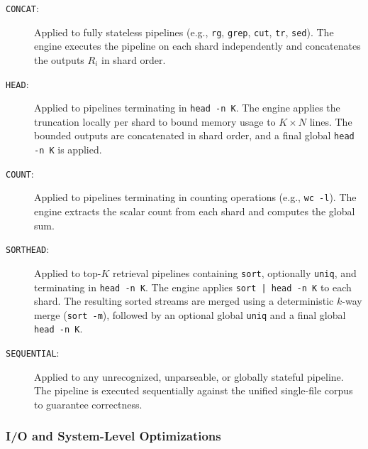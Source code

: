 \documentclass{article} %
\begin{document}
\begin{description}
    \item[\texttt{CONCAT}:] Applied to fully stateless pipelines (e.g., \texttt{rg}, \texttt{grep}, \texttt{cut}, \texttt{tr}, \texttt{sed}). The engine executes the pipeline on each shard independently and concatenates the outputs $R_i$ in shard order.
    
    \item[\texttt{HEAD}:] Applied to pipelines terminating in \texttt{head -n K}. The engine applies the truncation locally per shard to bound memory usage to $K \times N$ lines. The bounded outputs are concatenated in shard order, and a final global \texttt{head -n K} is applied.
    
    \item[\texttt{COUNT}:] Applied to pipelines terminating in counting operations (e.g., \texttt{wc -l}). The engine extracts the scalar count from each shard and computes the global sum.
    
    \item[\texttt{SORTHEAD}:] Applied to top-$K$ retrieval pipelines containing \texttt{sort}, optionally \texttt{uniq}, and terminating in \texttt{head -n K}. The engine applies \texttt{sort | head -n K} to each shard. The resulting sorted streams are merged using a deterministic $k$-way merge (\texttt{sort -m}), followed by an optional global \texttt{uniq} and a final global \texttt{head -n K}.
    
    \item[\texttt{SEQUENTIAL}:] Applied to any unrecognized, unparseable, or globally stateful pipeline. The pipeline is executed sequentially against the unified single-file corpus to guarantee correctness.
\end{description}

\subsubsection{I/O and System-Level Optimizations}
\end{document}
